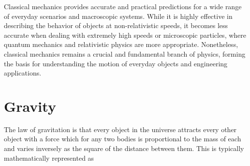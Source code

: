 Classical mechanics provides accurate and practical predictions for a wide range of everyday scenarios and macroscopic systems. While it is highly effective in describing the behavior of objects at non-relativistic speeds, it becomes less accurate when dealing with extremely high speeds or microscopic particles, where quantum mechanics and relativistic physics are more appropriate. Nonetheless, classical mechanics remains a crucial and fundamental branch of physics, forming the basis for understanding the motion of everyday objects and engineering applications.


\section{Gravity}

The law of gravitation is that every object in the universe attracts every other object with a force which for any two bodies is proportional to the mass of each and varies inversely as the square of the distance between them. This is typically mathematically represented as

